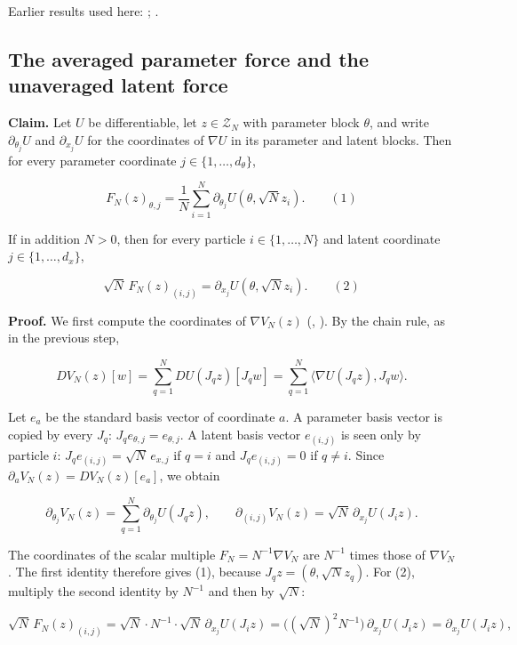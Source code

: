 \documentclass[11pt,a4paper]{report}
\begin{document}
Earlier results used here: \cite[Section~3.1.1]{LangevinLean2026IPLA}; \cite[Section~3.1.3]{LangevinLean2026IPLA}.
\subsection{\texorpdfstring{The averaged parameter force and the unaveraged latent force}{The averaged parameter force and the unaveraged latent force}}
\label{report-step-KIPLMC-Geometry-lean-4}


\textbf{Claim.} Let \(U\) be differentiable, let \(z\in\mathcal Z_N\) with parameter block \(\theta\), and write \(\partial_{\theta_j}U\) and \(\partial_{x_j}U\) for the coordinates of \(\nabla U\) in its parameter and latent blocks. Then for every parameter coordinate \(j\in\{1,\dots,d_\theta\}\),


\[F_N(z)_{\theta,j}=\frac1N\sum_{i=1}^N\partial_{\theta_j}U(\theta,\sqrt Nz_i).\qquad(1)\]


If in addition \(N>0\), then for every particle \(i\in\{1,\dots,N\}\) and latent coordinate \(j\in\{1,\dots,d_x\}\),


\[\sqrt N\,F_N(z)_{(i,j)}=\partial_{x_j}U(\theta,\sqrt Nz_i).\qquad(2)\]


\textbf{Proof.} We first compute the coordinates of \(\nabla V_N(z)\) (\cite[Section~3.1.5]{LangevinLean2026IPLA}, \cite[Section~3.1.5]{LangevinLean2026IPLA}). By the chain rule, as in the previous step,


\[DV_N(z)[w]=\sum_{q=1}^NDU(J_qz)[J_qw]=\sum_{q=1}^N\langle\nabla U(J_qz),J_qw\rangle.\]


Let \(e_a\) be the standard basis vector of coordinate \(a\). A parameter basis vector is copied by every \(J_q\): \(J_qe_{\theta,j}=e_{\theta,j}\). A latent basis vector \(e_{(i,j)}\) is seen only by particle \(i\): \(J_qe_{(i,j)}=\sqrt N\,e_{x,j}\) if \(q=i\) and \(J_qe_{(i,j)}=0\) if \(q\ne i\). Since \(\partial_aV_N(z)=DV_N(z)[e_a]\), we obtain


\[\partial_{\theta_j}V_N(z)=\sum_{q=1}^N\partial_{\theta_j}U(J_qz),\qquad\partial_{(i,j)}V_N(z)=\sqrt N\,\partial_{x_j}U(J_iz).\]


The coordinates of the scalar multiple \(F_N=N^{-1}\nabla V_N\) are \(N^{-1}\) times those of \(\nabla V_N\). The first identity therefore gives (1), because \(J_qz=(\theta,\sqrt Nz_q)\). For (2), multiply the second identity by \(N^{-1}\) and then by \(\sqrt N\):


\[\sqrt N\,F_N(z)_{(i,j)}=\sqrt N\cdot N^{-1}\cdot\sqrt N\,\partial_{x_j}U(J_iz)=\bigl((\sqrt N)^2N^{-1}\bigr)\,\partial_{x_j}U(J_iz)=\partial_{x_j}U(J_iz),\]
\end{document}
